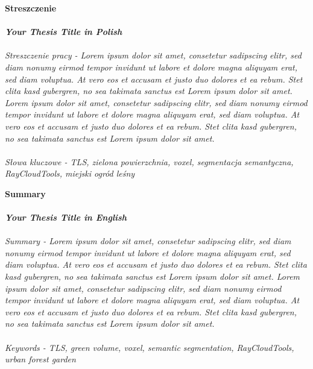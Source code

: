 \noindent
\textbf{Streszczenie} \\ %
\\
\textit{\textbf{Your Thesis Title in Polish}} \\ %
\\
\textit{\small Streszczenie pracy - Lorem ipsum dolor sit amet, consetetur sadipscing elitr, sed diam nonumy eirmod tempor invidunt ut labore et dolore magna aliquyam erat, sed diam voluptua. At vero eos et accusam et justo duo dolores et ea rebum. Stet clita kasd gubergren, no sea takimata sanctus est Lorem ipsum dolor sit amet. Lorem ipsum dolor sit amet, consetetur sadipscing elitr, sed diam nonumy eirmod tempor invidunt ut labore et dolore magna aliquyam erat, sed diam voluptua. At vero eos et accusam et justo duo dolores et ea rebum. Stet clita kasd gubergren, no sea takimata sanctus est Lorem ipsum dolor sit amet.
} %
\\
\\
\textit{Słowa kluczowe - TLS, zielona powierzchnia, voxel, segmentacja semantyczna, RayCloudTools, miejski ogród leśny} %

\vspace*{0.8cm}

\noindent
\textbf{Summary} \\ %
\\
\textit{\textbf{Your Thesis Title in English}} \\ %
\\
\textit{\small Summary - Lorem ipsum dolor sit amet, consetetur sadipscing elitr, sed diam nonumy eirmod tempor invidunt ut labore et dolore magna aliquyam erat, sed diam voluptua. At vero eos et accusam et justo duo dolores et ea rebum. Stet clita kasd gubergren, no sea takimata sanctus est Lorem ipsum dolor sit amet. Lorem ipsum dolor sit amet, consetetur sadipscing elitr, sed diam nonumy eirmod tempor invidunt ut labore et dolore magna aliquyam erat, sed diam voluptua. At vero eos et accusam et justo duo dolores et ea rebum. Stet clita kasd gubergren, no sea takimata sanctus est Lorem ipsum dolor sit amet.
} %
\\
\\
\textit{Keywords - TLS, green volume, voxel, semantic segmentation, RayCloudTools, urban forest garden} %
